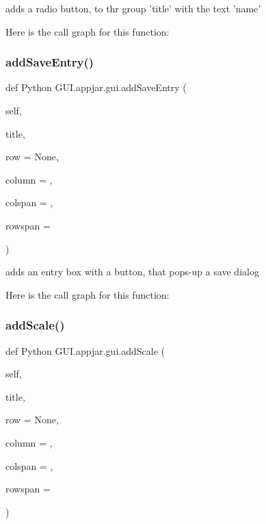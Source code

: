 \begin{DoxyVerb}adds a radio button, to thr group 'title' with the text 'name' \end{DoxyVerb}
 Here is the call graph for this function\+:
\mbox{\label{class_python_01_g_u_i_1_1appjar_1_1gui_a689b3e6fc4be6375e86e20f616ee7851}} 
\subsubsection{\texorpdfstring{add\+Save\+Entry()}{addSaveEntry()}}
{\footnotesize\ttfamily def Python G\+U\+I.\+appjar.\+gui.\+add\+Save\+Entry (\begin{DoxyParamCaption}\item[{}]{self,  }\item[{}]{title,  }\item[{}]{row = {\ttfamily None},  }\item[{}]{column = {},  }\item[{}]{colspan = {},  }\item[{}]{rowspan = {} }\end{DoxyParamCaption})}

\begin{DoxyVerb}adds an entry box with a button, that pops-up a save dialog \end{DoxyVerb}
 Here is the call graph for this function\+:
\mbox{\label{class_python_01_g_u_i_1_1appjar_1_1gui_a67f755e4d8eaa248bb8741f82b56c7e7}} 
\subsubsection{\texorpdfstring{add\+Scale()}{addScale()}}
{\footnotesize\ttfamily def Python G\+U\+I.\+appjar.\+gui.\+add\+Scale (\begin{DoxyParamCaption}\item[{}]{self,  }\item[{}]{title,  }\item[{}]{row = {\ttfamily None},  }\item[{}]{column = {},  }\item[{}]{colspan = {},  }\item[{}]{rowspan = {} }\end{DoxyParamCaption})}


